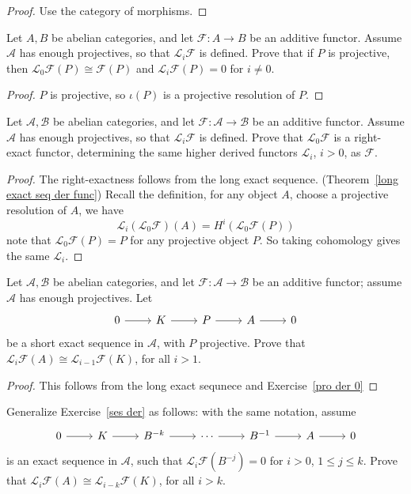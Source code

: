 \begin{proof}
Use the category of morphisms.
\end{proof}
\begin{exercise}\label{pro der 0}
Let $A,B$ be abelian categories, and let $\mathscr{F}:A\to B$ be an additive functor. Assume $\mathcal{A}$ has enough projectives, so that $\mathcal{L}_i\mathscr{F}$ is defined. Prove that if $P$ is projective, then $\mathcal{L}_0\mathscr{F}(P)\cong\mathscr{F}(P)$ and $\mathcal{L}_i\mathscr{F}(P)=0$ for $i\neq0$.
\end{exercise}
\begin{proof}
$P$ is projective, so $\iota(P)$ is a projective resolution of $P$.
\end{proof}
\begin{exercise}
Let $\mathcal{A},\mathcal{B}$ be abelian categories, and let $\mathscr{F}:\mathcal{A}\to\mathcal{B}$ be an additive functor. Assume $\mathcal{A}$ has enough projectives, so that $\mathcal{L}_i\mathscr{F}$ is defined. Prove that $\mathcal{L}_0\mathscr{F}$ is a
right-exact functor, determining the same higher derived functors $\mathcal{L}_i$, $i>0$, as $\mathscr{F}$.
\end{exercise}
\begin{proof}
The right-exactness follows from the long exact sequence. (Theorem~\ref{long exact seq der func})
Recall the definition, for any object $A$, choose a projective resolution of $A$, we have 
\[\mathcal{L}_i(\mathcal{L}_0\mathscr{F})(A)=H^i(\mathcal{L}_0\mathscr{F}(P))\]
note that $\mathcal{L}_0\mathscr{F}(P)=P$ for any projective object $P$. So taking cohomology gives the same $\mathcal{L}_i$.
\end{proof}
\begin{exercise}\label{ses der}
Let $\mathcal{A},\mathcal{B}$ be abelian categories, and let $\mathscr{F}:\mathcal{A}\to\mathcal{B}$ be an additive functor;
assume $\mathcal{A}$ has enough projectives. Let
\[\begin{tikzcd}
0\ar[r]&K\ar[r]&P\ar[r]&A\ar[r]&0
\end{tikzcd}\]
be a short exact sequence in $\mathcal{A}$, with $P$ projective. Prove that $\mathcal{L}_i\mathscr{F}(A)\cong\mathcal{L}_{i-1}\mathscr{F}(K)$,
for all $i>1$.
\end{exercise}
\begin{proof}
This follows from the long exact sequnece and Exercise~\ref{pro der 0}
\end{proof}
\begin{exercise}\label{exact seq der}
Generalize Exercise~\ref{ses der} as follows: with the same notation, assume
\[\begin{tikzcd}
0\ar[r]&K\ar[r]&B^{-k}\ar[r]&\cdots\ar[r]&B^{-1}\ar[r]&A\ar[r]&0
\end{tikzcd}\]
is an exact sequence in $\mathcal{A}$, such that $\mathcal{L}_i\mathscr{F}(B^{-j})=0$ for $i>0$, $1\leqslant j\leqslant k$. Prove that $\mathcal{L}_i\mathscr{F}(A)\cong\mathcal{L}_{i-k}\mathscr{F}(K)$, for all $i>k$.
\end{exercise}
